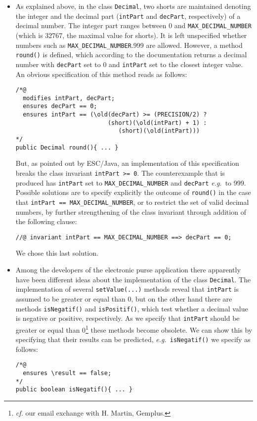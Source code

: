 \documentclass[a4paper]{llncs}
\begin{document}
\begin{itemize}
\item As explained above, in the class \texttt{Decimal}, two shorts
are maintained denoting the integer and the decimal part
(\texttt{intPart} and \texttt{decPart}, respectively) of a decimal
number. The integer part ranges between 0 and
\texttt{MAX\_DECIMAL\_NUMBER} (which is 32767, the maximal value for
shorts). It is left unspecified whether numbers such as
\texttt{MAX\_DECIMAL\_NUMBER}.999 are allowed. However, 
a method \texttt{round()} is defined, which
according to the documentation returns a decimal number with
\texttt{decPart} set to 0 and \texttt{intPart} set to the closest
integer value. An obvious specification of this method reads as
follows:
\begin{verbatim}
/*@ 
  modifies intPart, decPart;
  ensures decPart == 0;
  ensures intPart == (\old(decPart) >= (PRECISION/2) ?
                          (short)(\old(intPart) + 1) :
                             (short)(\old(intPart)))
*/
public Decimal round(){ ... }
\end{verbatim}
But, as pointed out by ESC/Java, an implementation of this
specification breaks the class invariant \texttt{intPart >= 0}. The
counterexample that is produced has
\texttt{intPart} set to \texttt{MAX\_DECIMAL\_NUMBER} and
\texttt{decPart} \emph{e.g.}~to 999. Possible solutions are to
specify explicitly the outcome of \texttt{round()} in the case that
\texttt{intPart == MAX\_DECIMAL\_NUMBER}, or to restrict the set of
valid decimal numbers, by further strengthening of the class invariant
through addition of the following clause:
\begin{verbatim}
//@ invariant intPart == MAX_DECIMAL_NUMBER ==> decPart == 0;
\end{verbatim}
We chose this last solution. 

\item Among the developers of the electronic purse application there
apparently have been different ideas about the implementation of the
class \texttt{Decimal}. The implementation of several
\texttt{setValue(...)} methods
reveal that \texttt{intPart} is assumed to be greater or equal than
0, but on the other hand there are methods
\texttt{isNegatif()} and \texttt{isPositif()}, which test whether a
decimal value is negative or positive, respectively. As we specify
that \texttt{intPart} should be greater or equal than
0\footnote{\emph{cf.} our email exchange with H. Martin, Gemplus.}
these methods become obsolete. We can show this by specifying
that their results can be predicted, \emph{e.g.}~\texttt{isNegatif()} we 
specify as follows:
\begin{verbatim}
/*@ 
  ensures \result == false;
*/
public boolean isNegatif(){ ... }
\end{verbatim}



\end{itemize}
\end{document}
